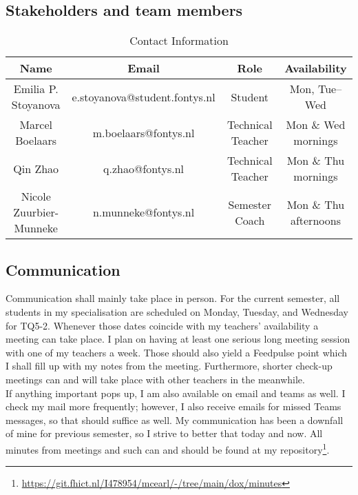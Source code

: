 \documentclass{article}
\begin{document}
    \subsection{Stakeholders and team members}
    \begin{table}[h!]
        \centering
        \begin{tabular}{|c|c|c|c|}
            \hline \textbf{Name} & \textbf{Email} & \textbf{Role} & \textbf{Availability} \\
            \hline \makecell{Emilia P.\\Stoyanova} & e.stoyanova@student.fontys.nl & Student & Mon, Tue--Wed \\
            \hline Marcel Boelaars & m.boelaars@fontys.nl & Technical Teacher & \makecell{Mon \& Wed\\mornings} \\
            \hline Qin Zhao & q.zhao@fontys.nl & Technical Teacher & \makecell{Mon \& Thu\\mornings} \\
            \hline \makecell{Nicole Zuurbier-\\ Munneke} & n.munneke@fontys.nl & Semester Coach & \makecell{Mon \& Thu\\afternoons} \\
            \hline
        \end{tabular}
        \caption{Contact Information}
        \label{tab:contact-information}
    \end{table}
    \subsection{Communication}
    Communication shall mainly take place in person. For the current semester, all students in my specialisation are scheduled on Monday, Tuesday, and Wednesday for TQ5-2. Whenever those dates coincide with my teachers' availability a meeting can take place. I plan on having at least one serious long meeting session with one of my teachers a week. Those should also yield a Feedpulse point which I shall fill up with my notes from the meeting. Furthermore, shorter check-up meetings can and will take place with other teachers in the meanwhile. \\

    If anything important pops up, I am also available on email and teams as well. I check my mail more frequently; however, I also receive emails for missed Teams messages, so that should suffice as well. My communication has been a downfall of mine for previous semester, so I strive to better that today and now. All minutes from meetings and such can and should be found at my repository\footnote{\url{https://git.fhict.nl/I478954/mcearl/-/tree/main/dox/minutes}}.
\end{document}
